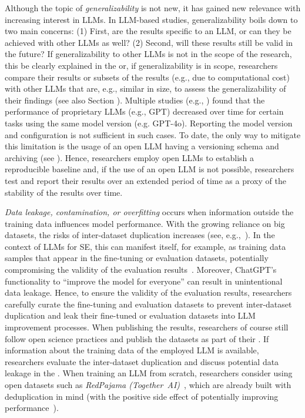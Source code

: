 Although the topic of \emph{generalizability} is not new, it has gained new relevance with increasing interest in LLMs.
In LLM-based studies, generalizability boils down to two main concerns:
(1) First, are the results specific to an LLM, or can they be achieved with other LLMs as well? 
(2) Second, will these results still be valid in the future?
If generalizability to other LLMs is not in the scope of the research, this \must be clearly explained in the \paper or, if generalizability is in scope, researchers \must compare their results or subsets of the results (e.g., due to computational cost) with other LLMs that are, e.g., similar in size, to assess the generalizability of their findings (see also Section \openllm).
Multiple studies (e.g., \cite{DBLP:journals/corr/abs-2307-09009, doi:10.1148/radiol.232411}) found that the performance of proprietary LLMs (e.g., GPT) decreased over time for certain tasks using the same model version (e.g. GPT-4o).
Reporting the model version and configuration is not sufficient in such cases.
To date, the only way to mitigate this limitation is the usage of an open LLM having a versioning schema and  archiving (see \openllm).
Hence, researchers \should employ open LLMs to establish a reproducible baseline and, if the use of an open LLM is not possible, researchers \should test and report their results over an extended period of time as a proxy of the stability of the results over time.

\emph{Data leakage, contamination, or overfitting} occurs when information outside the training data influences model performance. %
With the growing reliance on big datasets, the risks of inter-dataset duplication increases (see, e.g.,~\cite{DBLP:journals/pacmpl/LopesMMSYZSV17, DBLP:conf/oopsla/Allamanis19}). 
In the context of LLMs for SE, this can manifest itself, for example, as training data samples that appear in the fine-tuning or evaluation datasets, potentially compromising the validity of the evaluation results~\cite{DBLP:journals/tse/LopezCSSV25}.
Moreover, ChatGPT's functionality to ``improve the model for everyone'' can result in unintentional data leakage.
Hence, to ensure the validity of the evaluation results, researchers \should carefully curate the fine-tuning and evaluation datasets to prevent inter-dataset duplication and \mustnot leak their fine-tuned or evaluation datasets into LLM improvement processes.
When publishing the results, researchers \should of course still follow open science practices and publish the datasets as part of their \supplementarymaterial.
If information about the training data of the employed LLM is available, researchers \should evaluate the inter-dataset duplication and \must discuss potential data leakage in the \paper.
When training an LLM from scratch, researchers \may consider using open datasets such as \emph{RedPajama (Together~AI)}~\cite{together2023redpajama}, which are already built with deduplication in mind (with the positive side effect of potentially improving performance~\cite{DBLP:conf/acl/LeeINZECC22}).

